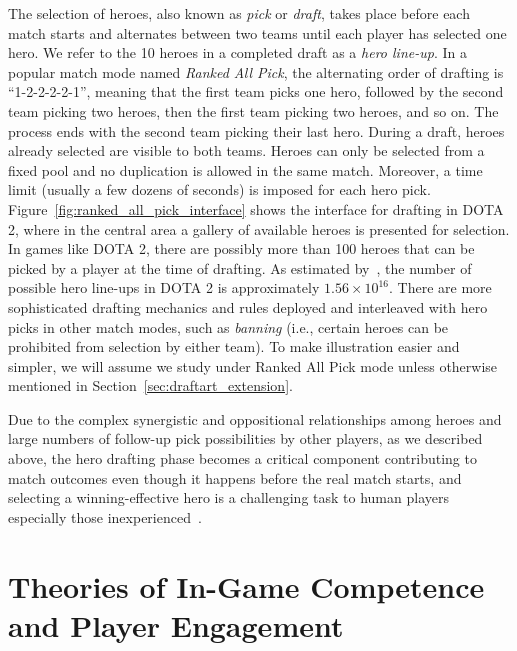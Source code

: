  
The selection of heroes, also known as \textit{pick} or \textit{draft}, takes place before each match starts and alternates between two teams until each player has selected one hero. We refer to the 10 heroes in a completed draft as a \textit{hero line-up}. In a popular match mode named \textit{Ranked All Pick}, the alternating order of drafting is ``1-2-2-2-2-1'', meaning that the first team picks one hero, followed by the second team picking two heroes, then the first team picking two heroes, and so on. The process ends with the second team picking their last hero. During a draft, heroes already selected are visible to both teams. Heroes can only be selected from a fixed pool and no duplication is allowed in the same match. Moreover, a time limit (usually a few dozens of seconds) is imposed for each hero pick. Figure~\ref{fig:ranked_all_pick_interface} shows the interface for drafting in DOTA 2, where in the central area a gallery of available heroes is presented for selection. In games like DOTA 2, there are possibly more than 100 heroes that can be picked by a player at the time of drafting. As estimated by~\cite{hanke2017reco}, the number of possible hero line-ups in DOTA 2 is approximately $1.56 \times 10^{16}$. There are more sophisticated drafting mechanics and rules deployed and interleaved with hero picks in other match modes, such as \textit{banning} (i.e., certain heroes can be prohibited from selection by either team). To make illustration easier and simpler, we will assume we study under Ranked All Pick mode unless otherwise mentioned in Section~\ref{sec:draftart_extension}.

Due to the complex synergistic and oppositional relationships among heroes and large numbers of follow-up pick possibilities by other players, as we described above, the hero drafting phase becomes a critical component contributing to match outcomes even though it happens before the real match starts, and selecting a winning-effective hero is a challenging task to human players especially those inexperienced~\cite{johnson2015all}. 




\section{Theories of In-Game Competence and Player Engagement}

